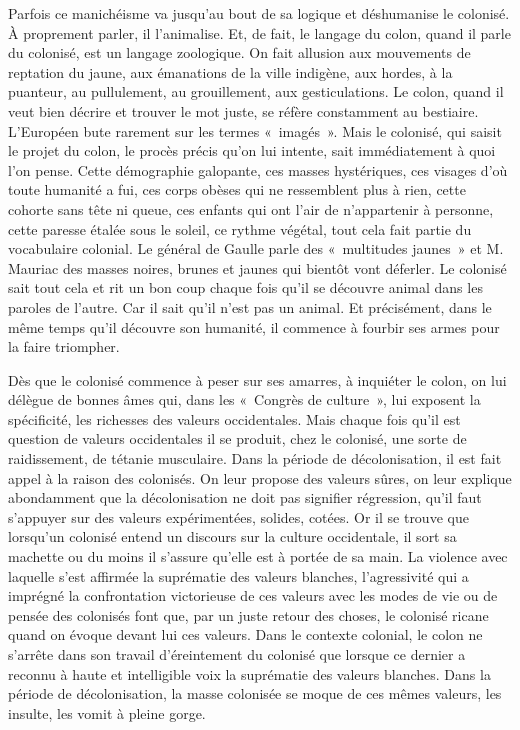 \documentclass[french,twoside]{book} %
\begin{document}
Parfois ce manichéisme va jusqu’au bout de sa logique et déshumanise le colonisé. À proprement parler, il l’animalise. Et, de fait, le langage du colon, quand il parle du colonisé, est un langage zoologique. On fait allusion aux mouvements de reptation du jaune, aux émanations de la ville indigène, aux hordes, à la puanteur, au pullulement, au grouillement, aux gesticulations. Le colon, quand il veut bien décrire et trouver le mot juste, se réfère constamment au bestiaire. L’Européen bute rarement sur les termes « imagés ». Mais le colonisé, qui saisit le projet du colon, le procès précis qu’on lui intente, sait immédiatement à quoi l’on pense. Cette démographie galopante, ces masses hystériques, ces visages d’où toute humanité a fui, ces corps obèses qui ne ressemblent plus à rien, cette cohorte sans tête ni queue, ces enfants qui ont l’air de n’appartenir à personne, cette paresse étalée sous le soleil, ce rythme végétal, tout cela fait partie du vocabulaire colonial. Le général de Gaulle parle des   « multitudes jaunes » et M. Mauriac des masses noires, brunes et jaunes qui bientôt vont déferler. Le colonisé sait tout cela et rit un bon coup chaque fois qu’il se découvre animal dans les paroles de l’autre. Car il sait qu’il n’est pas un animal. Et précisément, dans le même temps qu’il découvre son humanité, il commence à fourbir ses armes pour la faire triompher.\par
\bigbreak
\noindent Dès que le colonisé commence à peser sur ses amarres, à inquiéter le colon, on lui délègue de bonnes âmes qui, dans les « Congrès de culture », lui exposent la spécificité, les richesses des valeurs occidentales. Mais chaque fois qu’il est question de valeurs occidentales il se produit, chez le colonisé, une sorte de raidissement, de tétanie musculaire. Dans la période de décolonisation, il est fait appel à la raison des colonisés. On leur propose des valeurs sûres, on leur explique abondamment que la décolonisation ne doit pas signifier régression, qu’il faut s’appuyer sur des valeurs expérimentées, solides, cotées. Or il se trouve que lorsqu’un colonisé entend un discours sur la culture occidentale, il sort sa machette ou du moins il s’assure qu’elle est à portée de sa main. La violence avec laquelle s’est affirmée la suprématie des valeurs blanches, l’agressivité qui a imprégné la confrontation victorieuse de ces valeurs avec les modes de vie ou de pensée des colonisés font que, par un juste retour des choses, le colonisé ricane quand on évoque devant lui ces valeurs. Dans le contexte colonial, le colon ne s’arrête dans son travail d’éreintement du colonisé que lorsque ce dernier a reconnu à haute et intelligible voix la suprématie des valeurs blanches. Dans la période de décolonisation, la masse colonisée se moque de ces mêmes valeurs, les insulte, les vomit à pleine gorge.\par
\end{document}
